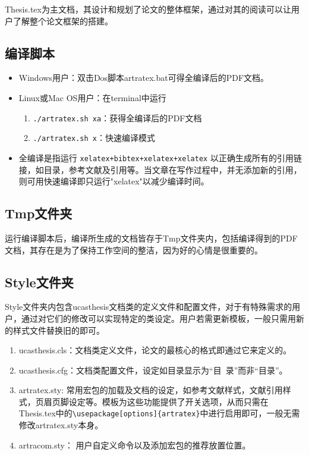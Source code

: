 Thesis.tex为主文档，其设计和规划了论文的整体框架，通过对其的阅读可以让用户了解整个论文框架的搭建。

\subsection{编译脚本}

\begin{itemize}
    \item Windows用户：双击Dos脚本artratex.bat可得全编译后的PDF文档。
    \item Linux或Mac OS用户：在terminal中运行
        \begin{enumerate}
            \item \verb|./artratex.sh xa|：获得全编译后的PDF文档
            \item \verb|./artratex.sh x|：快速编译模式
        \end{enumerate}
    \item 全编译是指运行 \verb|xelatex+bibtex+xelatex+xelatex| 以正确生成所有的引用链接，如目录，参考文献及引用等。当文章在写作过程中，并无添加新的引用，则可用快速编译即只运行"xelatex"以减少编译时间。
\end{itemize}


\subsection{Tmp文件夹}

运行编译脚本后，编译所生成的文档皆存于Tmp文件夹内，包括编译得到的PDF文档，其存在是为了保持工作空间的整洁，因为好的心情是很重要的。

\subsection{Style文件夹}

Style文件夹内包含ucasthesis文档类的定义文件和配置文件，对于有特殊需求的用户，通过对它们的修改可以实现特定的类设定。用户若需更新模板，一般只需用新的样式文件替换旧的即可。

\begin{enumerate}
  \item ucasthesis.cls：文档类定义文件，论文的最核心的格式即通过它来定义的。
  \item ucasthesis.cfg：文档类配置文件，设定如目录显示为“目~录”而非“目录”。
  \item artratex.sty: 常用宏包的加载及文档的设定，如参考文献样式，文献引用样式，页眉页脚设定等。模板为这些功能提供了开关选项，从而只需在Thesis.tex中的\verb+\usepackage[options]{artratex}+中进行启用即可，一般无需修改artratex.sty本身。
  \item artracom.sty： 用户自定义命令以及添加宏包的推荐放置位置。
\end{enumerate}

